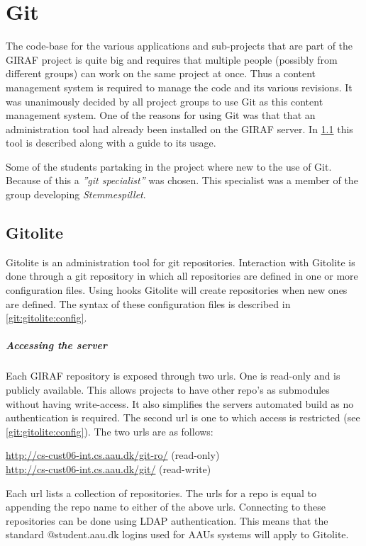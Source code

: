 \chapter{Git}
\newcommand{\git}{Git}\newcommand{\Git}{Git}
\newcommand{\gitolite}{Gitolite}\newcommand{\Gitolite}{Gitolite}
The code-base for the various applications and sub-projects that are part of the GIRAF project is quite big and requires that multiple people (possibly from different groups) can work on the same project at once.
Thus a content management system is required to manage the code and its various revisions. 
It was unanimously decided by all project groups to use \git{} as this content management system.
One of the reasons for using \git{} was that that an administration tool had already been installed on the GIRAF server.
In \cref{git:gitolite} this tool is described along with a guide to its usage.

Some of the students partaking in the project where new to the use of \git{}.
Because of this a \textit{''git specialist''} was chosen.
This specialist was a member of the group developing \textit{Stemmespillet}.

\section{\Gitolite{}}\label{git:gitolite}
\Gitolite{} is an administration tool for git repositories.
Interaction with \gitolite{} is done through a git repository in which all repositories are defined in one or more configuration files.
Using hooks \gitolite{} will create repositories when new ones are defined.
The syntax of these configuration files is described in \cref{git:gitolite:config}.

\paragraph{Accessing the server}
Each GIRAF repository is exposed through two urls.
One is read-only and is publicly available.
This allows projects to have other repo's as submodules without having write-access.
It also simplifies the servers automated build as no authentication is required.
The second url is one to which access is restricted (see \cref{git:gitolite:config}).
The two urls are as follows:
\begin{center}
\url{http://cs-cust06-int.cs.aau.dk/git-ro/} (read-only)\\
\url{http://cs-cust06-int.cs.aau.dk/git/} (read-write)
\end{center}
Each url lists a collection of repositories.
The urls for a repo is equal to appending the repo name to either of the above urls.
Connecting to these repositories can be done using LDAP authentication.
This means that the standard @student.aau.dk logins used for AAUs systems will apply to \gitolite{}.

